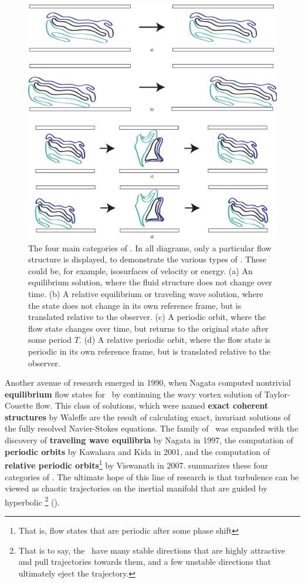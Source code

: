 \begin{figure}[h]
\centerline{\includegraphics[scale=0.5]{Figs/ECSClassification}}
\caption{The four main categories of \ecs. In all diagrams, only a particular flow structure is displayed, to demonstrate the various types of \ecs. These could be, for example, isosurfaces of velocity or energy. (a) An {equilibrium} solution, where the fluid structure does not change over time. (b) A {relative equilibrium} or {traveling wave} solution, where the state does not change in its own reference frame, but is translated relative to the observer. (c) A {periodic orbit}, where the flow state changes over time, but returns to the original state after some period $T$. (d) A {relative periodic orbit}, where the flow state is periodic in its own reference frame, but is translated relative to the observer.}\label{fig:ECS}
\end{figure}


Another avenue of research emerged in 1990, when Nagata computed nontrivial {\bf equilibrium} flow states for \pCf\ by continuing the wavy vortex solution of Taylor-Couette flow. This class of solutions, which were named {\bf exact coherent structures} by Waleffe are the result of calculating exact, invariant solutions of the fully resolved Navier-Stokes equations. The family of \ecs\ was expanded with the discovery of {\bf traveling wave equilibria} by Nagata in 1997, the computation of {\bf periodic orbits} by Kawahara and Kida in 2001, and the computation of {\bf relative periodic orbits}\footnote{That is, flow states that are periodic after some phase shift} by Viswanath in 2007.  summarizes these four categories of \ecs. The ultimate hope of this line of research is that turbulence can be viewed as chaotic trajectories on the inertial manifold that are guided by hyperbolic \ecs\footnote{That is to say, the \ecs\ have many stable directions that are highly attractive and pull trajectories towards them, and a few unstable directions that ultimately eject the trajectory.} (). \\

